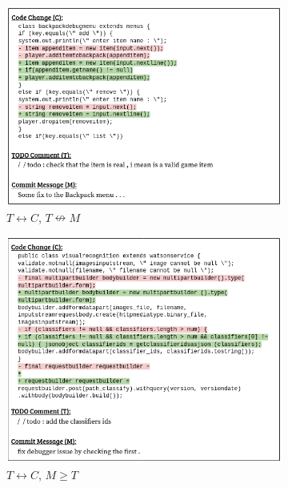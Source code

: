 \begin{figure}[t]
	\centering
	\begin{subfigure}{.45\textwidth}
		\includegraphics[width=\textwidth]{images/mex_1.png}
		\caption{$T \leftrightarrow C$, $T \nleftrightarrow M$}
		\label{fig:mex_1}
	\end{subfigure}
	\begin{subfigure}{.45\textwidth}
		\includegraphics[width=\textwidth]{images/mex_2.png}
		\caption{$T \leftrightarrow C$, $M \geq T$}
		\label{fig:mex_2}
	\end{subfigure}
	\begin{subfigure}{.45\textwidth}

\end{subfigure}
\end{figure}
